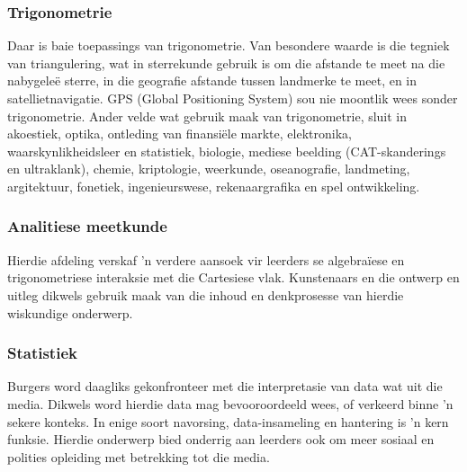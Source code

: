 \subsubsection{Trigonometrie}
Daar is baie toepassings van trigonometrie. Van besondere waarde is die tegniek van triangulering, wat in sterrekunde gebruik is om die afstande te meet na die nabygeleë sterre, in die geografie afstande tussen landmerke te meet, en in satellietnavigatie. GPS (Global Positioning System) sou nie moontlik wees sonder trigonometrie. Ander velde wat gebruik maak van trigonometrie, sluit in akoestiek,
optika, ontleding van finansiële markte, elektronika, waarskynlikheidsleer en statistiek, biologie, mediese beelding (CAT-skanderings en ultraklank), chemie, kriptologie, weerkunde, oseanografie, landmeting, argitektuur, fonetiek, ingenieurswese, rekenaargrafika en spel ontwikkeling.

\subsubsection{Analitiese meetkunde}
Hierdie afdeling verskaf 'n verdere aansoek vir leerders se algebraïese en trigonometriese interaksie met die Cartesiese vlak. Kunstenaars en die ontwerp en uitleg dikwels gebruik maak van die inhoud en denkprosesse van hierdie wiskundige onderwerp.

\subsubsection{Statistiek}
Burgers word daagliks gekonfronteer met die interpretasie van data wat uit die media. Dikwels word hierdie data mag bevooroordeeld wees, of verkeerd binne 'n sekere konteks. In enige soort navorsing, data-insameling en hantering is 'n kern funksie. Hierdie onderwerp bied onderrig aan leerders ook om meer sosiaal en polities opleiding met betrekking tot die media.

